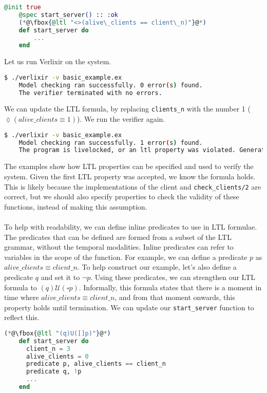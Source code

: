 \begin{lstlisting}[language=Elixir, xleftmargin=.3\linewidth, caption={Example LTL property}]
    @init true
    @spec start_server() :: :ok
    (*@\fbox{@ltl "<>(alive\_clients == client\_n)"}@*)
    def start_server do
        ...
    end
\end{lstlisting}
Let us run Verlixir on the system.
\begin{lstlisting}[language=bash, xleftmargin=.3\linewidth]
    $ ./verlixir -v basic_example.ex
    Model checking ran successfully. 0 error(s) found.
    The verifier terminated with no errors.
\end{lstlisting}
We can update the LTL formula, by replacing \texttt{clients\_n} with the number 1 ($\lozenge (alive\_clients \equiv 1)$). We run the verifier again.
\begin{lstlisting}[language=bash, xleftmargin=.1\linewidth]
    $ ./verlixir -v basic_example.ex
    Model checking ran successfully. 1 error(s) found.
    The program is livelocked, or an ltl property was violated. Generating trace.
\end{lstlisting}
The examples show how LTL properties can be specified and used to verify the system. Given the first LTL property was accepted, we know the formula holds. This is likely because the implementations of the client and \texttt{check\_clients/2} are correct, but we should also specify properties to check the validity of these functions, instead of making this assumption.
\\ \\
To help with readability, we can define inline predicates to use in LTL formulae. The predicates that can be defined are formed from a subset of the LTL grammar, without the temporal modalities. Inline predicates can refer to variables in the scope of the function. For example, we can define a predicate \( p \) as $alive\_clients \equiv client\_n$. To help construct our example, let's also define a predicate \( q \) and set it to \( \neg p \). Using these predicates, we can strengthen our LTL formula to \( (q) \mathcal{U} (\square p) \). Informally, this formula states that there is a moment in time where $alive\_clients \equiv client\_n$, and from that moment onwards, this property holds until termination. We can update our \texttt{start\_server} function to reflect this.
\begin{lstlisting}[language=Elixir, xleftmargin=.3\linewidth]
    (*@\fbox{@ltl "(q)U([]p)"}@*)
    def start_server do
      client_n = 3
      alive_clients = 0
      predicate p, alive_clients == client_n
      predicate q, !p
      ...
    end
\end{lstlisting}
